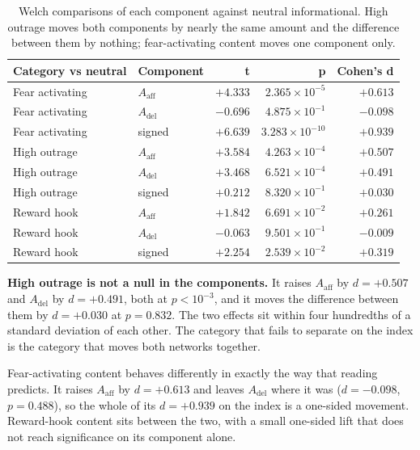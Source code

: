\begin{table}[htbp]
\centering
\begin{tabular}{@{}llrrr@{}}
\toprule
\textbf{Category vs neutral} & \textbf{Component} & \textbf{t} & \textbf{p} & \textbf{Cohen's d} \\
\midrule
Fear activating & $A_{\mathrm{aff}}$ & $+4.333$ & $2.365\times 10^{-5}$  & $+0.613$ \\
Fear activating & $A_{\mathrm{del}}$ & $-0.696$ & $4.875\times 10^{-1}$  & $-0.098$ \\
Fear activating & signed             & $+6.639$ & $3.283\times 10^{-10}$ & $+0.939$ \\
\midrule
High outrage    & $A_{\mathrm{aff}}$ & $+3.584$ & $4.263\times 10^{-4}$  & $+0.507$ \\
High outrage    & $A_{\mathrm{del}}$ & $+3.468$ & $6.521\times 10^{-4}$  & $+0.491$ \\
High outrage    & signed             & $+0.212$ & $8.320\times 10^{-1}$  & $+0.030$ \\
\midrule
Reward hook     & $A_{\mathrm{aff}}$ & $+1.842$ & $6.691\times 10^{-2}$  & $+0.261$ \\
Reward hook     & $A_{\mathrm{del}}$ & $-0.063$ & $9.501\times 10^{-1}$  & $-0.009$ \\
Reward hook     & signed             & $+2.254$ & $2.539\times 10^{-2}$  & $+0.319$ \\
\bottomrule
\end{tabular}
\caption{Welch comparisons of each component against neutral informational. High outrage moves both components by nearly the same amount and the difference between them by nothing; fear-activating content moves one component only.}
\label{tab:component-welch}
\end{table}

\textbf{High outrage is not a null in the components.} It raises $A_{\mathrm{aff}}$ by
$d = +0.507$ and $A_{\mathrm{del}}$ by $d = +0.491$, both at $p < 10^{-3}$, and it moves the
difference between them by $d = +0.030$ at $p = 0.832$. The two effects sit within four
hundredths of a standard deviation of each other. The category that fails to separate on the
index is the category that moves both networks together.

Fear-activating content behaves differently in exactly the way that reading predicts. It
raises $A_{\mathrm{aff}}$ by $d = +0.613$ and leaves $A_{\mathrm{del}}$ where it was
($d = -0.098$, $p = 0.488$), so the whole of its $d = +0.939$ on the index is a one-sided
movement. Reward-hook content sits between the two, with a small one-sided lift that does not
reach significance on its component alone.

